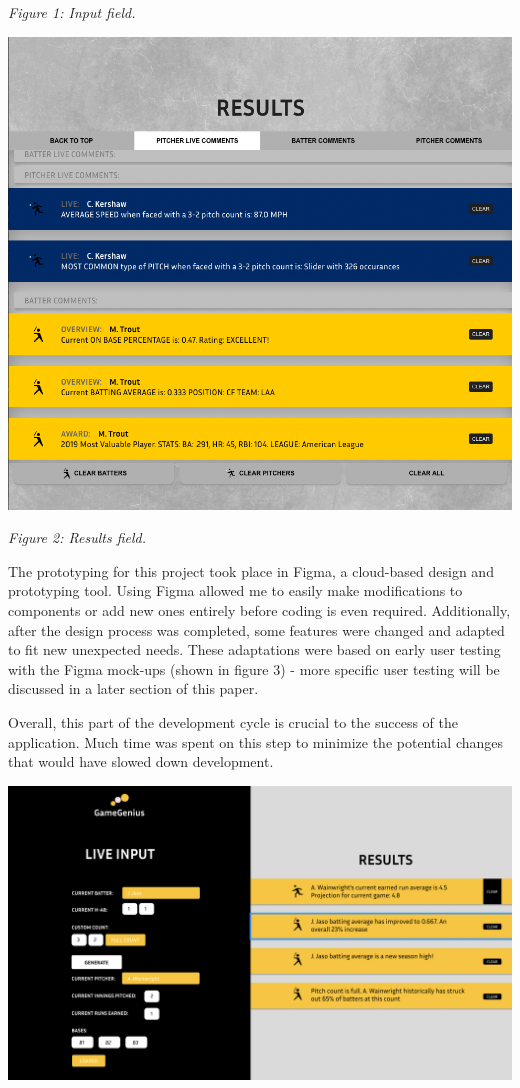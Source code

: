\documentclass[10pt,twocolumn]{article}
\begin{document}
\textit{Figure 1: Input field. }

\includegraphics[scale=0.20]{images/results.png}

\textit{Figure 2: Results field.}

The prototyping for this project took place in Figma, a cloud-based design and prototyping tool. Using Figma allowed me to easily make modifications to components or add new ones entirely before coding is even required. 
Additionally, after the design process was completed, some features were changed and adapted to fit new unexpected needs. These adaptations were based on early user testing with the Figma mock-ups (shown in figure 3) - more specific user testing will be discussed in a later section of this paper.

Overall, this part of the development cycle is crucial to the success of the application. Much time was spent on this step to minimize the potential changes that would have slowed down development. 

\includegraphics[scale=0.3]{images/initial-designs.png}
\end{document}

